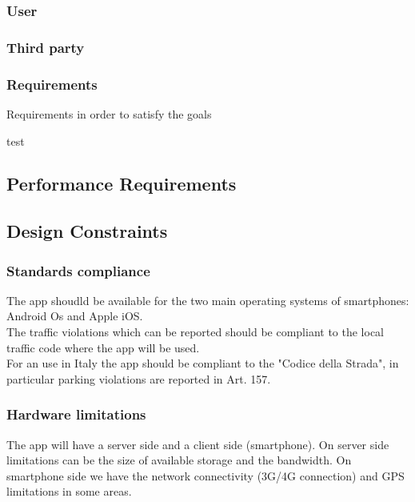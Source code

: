 
\subsubsection{User}
\subsubsection{Third party}

\subsubsection{Requirements}
Requirements in order to satisfy the goals
\begin{enumerate}
   test
\end{enumerate}



\subsection{Performance Requirements}


\subsection{Design Constraints}%

\subsubsection{Standards compliance}
The app shoudld be available for the two main operating systems of smartphones: Android Os and Apple iOS.\\
The traffic violations which can be reported should be compliant to the local traffic code where the app will be used.\\
For an use in Italy the app should be compliant to the "Codice della Strada", in particular parking violations are reported in Art. 157.\\


\subsubsection{Hardware limitations}
The app will have a server side and a client side (smartphone).
On server side limitations can be the size of available storage and the bandwidth.
On smartphone side we have the network connectivity (3G/4G connection) and GPS limitations in some areas.

